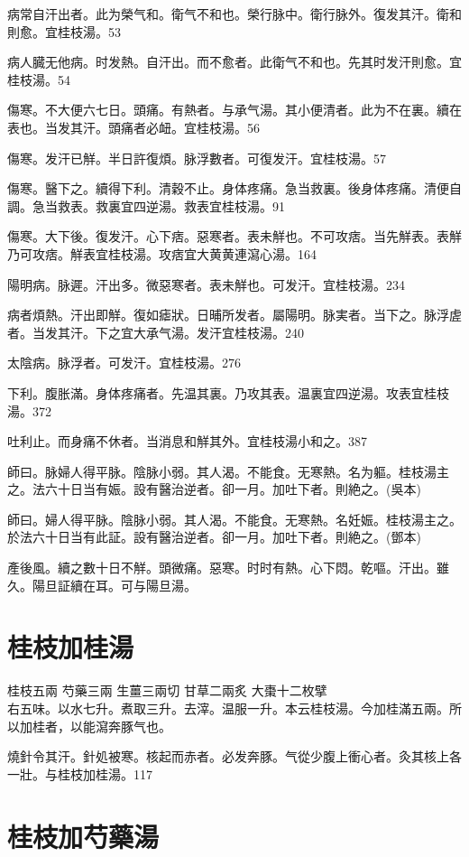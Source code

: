\documentclass[12pt,twoside,UTF8,b5paper]{ctexbook}
\begin{document}
病常自汗出者。此为榮气和。衛气不和也。榮行脉中。衛行脉外。復发其汗。衛和則愈。宜桂枝湯。53

病人臓无他病。时发熱。自汗出。而不愈者。此衛气不和也。先其时发汗則愈。宜桂枝湯。54

傷寒。不大便六七日。頭痛。有熱者。与承气湯。其小便清者。此为不在裏。續在表也。当发其汗。頭痛者必衄。宜桂枝湯。56

傷寒。发汗已觧。半日許復煩。脉浮數者。可復发汗。宜桂枝湯。57

傷寒。醫下之。續得下利。清穀不止。身体疼痛。急当救裏。後身体疼痛。清便自調。急当救表。救裏宜四逆湯。救表宜桂枝湯。91

傷寒。大下後。復发汗。心下痞。惡寒者。表未觧也。不可攻痞。当先觧表。表觧乃可攻痞。觧表宜桂枝湯。攻痞宜大黄黄連瀉心湯。164

陽明病。脉遲。汗出多。微惡寒者。表未觧也。可发汗。宜桂枝湯。234

病者煩熱。汗出即觧。復如瘧狀。日晡所发者。屬陽明。脉実者。当下之。脉浮虗者。当发其汗。下之宜{大}承气湯。发汗宜桂枝湯。240

太陰病。脉浮者。可发汗。宜桂枝湯。276

下利。腹{胀}滿。身体疼痛者。先温其裏。乃攻其表。温裏宜四逆湯。攻表宜桂枝湯。372

吐利止。而身痛不休者。当消息和觧其外。宜桂枝湯小和之。387

師曰。脉婦人得平脉。陰脉小弱。其人渴。不能食。无寒熱。名为軀。桂枝湯主之。法六十日当有娠。設有醫治逆者。卻一月。加吐下者。則絶之。(吳本)

師曰。婦人得平脉。陰脉小弱。其人渴。不能食。无寒熱。名妊娠。桂枝湯主之。於法六十日当有此証。設有醫治逆者。卻一月。加吐下者。則絶之。(鄧本)

產後風。續之數十日不觧。頭微痛。惡寒。时时有熱。心下悶。乾嘔。汗出。雖久。陽旦証續在耳。可与陽旦湯。

\section{桂枝加桂湯}

桂枝{\scriptsize 五兩} 芍藥{\scriptsize 三兩} 生薑{\scriptsize 三兩切} 甘草{\scriptsize 二兩炙} 大棗{\scriptsize 十二枚擘}\\
右五味。以水七升。煮取三升。去滓。温服一升。本云桂枝湯。今加桂滿五兩。所以加桂者，以能瀉奔豚气也。

燒針令其汗。針処被寒。核起而赤者。必发奔豚。气從少腹上衝心者。灸其核上各一壯。与桂枝加桂湯。117

\section{桂枝加芍藥湯}
\end{document}
